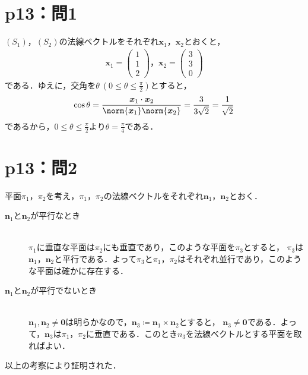 %
\section*{p13：問1}
%
\begin{tanswer}
  $(S_1)$，$(S_2)$の法線ベクトルをそれぞれ$\bm{x}_1$，$\bm{x}_2$とおくと，
  \begin{gather*}
    \bm{x}_1 =
    \begin{pmatrix}
      1 \\
      1 \\
      2
    \end{pmatrix}
    ，
    \bm{x}_2 =
    \begin{pmatrix}
      3 \\
      3 \\
      0
    \end{pmatrix}
  \end{gather*}
  である．ゆえに，交角を$\theta ~(0 \le \theta \le \frac{\pi}{2})$とすると，
  \[
    \cos \theta = \frac{\bm{x}_1 \cdot \bm{x}_2}{\norm{\bm{x}_1} \norm{\bm{x}_2}}=\frac{3}{3\sqrt{2}}=\frac{1}{\sqrt{2}}
  \]
  であるから，$0 \le \theta \le \frac{\pi}{2}$より$\theta =\frac{\pi}{4}$である．
\end{tanswer}
%
\section*{p13：問2}

\begin{tproof}
  平面$\pi_1$，$\pi_2$を考え，$\pi_1$，$\pi_2$の法線ベクトルをそれぞれ$\bm{n}_1$，$\bm{n}_2$とおく．
  \begin{description}
    \item[$\bm{n}_1$と$\bm{n}_2$が平行なとき] \mbox{}\\
          $\pi_1$に垂直な平面は$\pi_2$にも垂直であり，このような平面を$\pi_3$とすると，
          $\pi_3$は$\bm{n}_1$，$\bm{n}_2$と平行である．よって$\pi_3$と$\pi_1$，$\pi_2$はそれぞれ並行であり，このような平面は確かに存在する．
    \item[$\bm{n}_1$と$\bm{n}_2$が平行でないとき] \mbox{} \\
          $\bm{n}_1 , \bm{n}_2 \ne \bm{0}$は明らかなので，$\bm{n}_3 \coloneqq \bm{n}_1 \times \bm{n}_2$とすると，
          $\bm{n}_3 \ne \bm{0}$である．よって，$\bm{n}_3$は$\pi_1$，$\pi_2$に垂直である．このとき$n_3$を法線ベクトルとする平面を取ればよい．
  \end{description}
  以上の考察により証明された．
\end{tproof}

